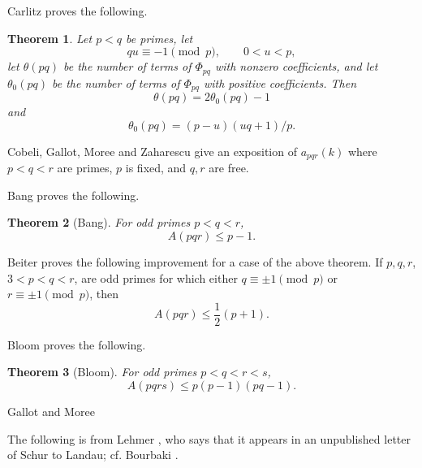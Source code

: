 \documentclass{amsart}
\newtheorem{theorem}{Theorem}
\theoremstyle{definition}
\begin{document}
Carlitz \cite{carlitz1966} proves the following.

\begin{theorem}
Let $p<q$ be primes,
let
\[
qu \equiv -1 \pmod{p},\qquad 0<u<p,
\]
let 
$\theta(pq)$ be the number of terms of $\Phi_{pq}$ with nonzero coefficients,
and
let $\theta_0(pq)$ be the number of terms of $\Phi_{pq}$ with positive coefficients.
Then
\[
\theta(pq) = 2\theta_0(pq)-1
\]
and
\[
\theta_0(pq) = (p-u)(uq+1)/p.
\]
\end{theorem}

Cobeli, Gallot, Moree and Zaharescu \cite{cobeli} give an exposition of $a_{pqr}(k)$ where $p<q<r$ are primes,
$p$ is fixed, and $q,r$ are free.






Bang \cite{bang} proves the following.

\begin{theorem}[Bang]
For odd primes $p<q<r$,
\[
A(pqr) \leq p-1.
\] 
\end{theorem}

Beiter \cite{beiter1968} proves the following improvement for a case of the above theorem.
If $p,q,r$, $3<p<q<r$, are odd primes for which
either $q \equiv \pm 1 \pmod{p}$ or $r \equiv \pm 1 \pmod{p}$, then
\[
A(pqr) \leq \frac{1}{2}(p+1).
\]



Bloom \cite{bloom} proves the following.

\begin{theorem}[Bloom]
For odd primes $p<q<r<s$,
\[
A(pqrs) \leq p(p-1)(pq-1).
\]
\end{theorem}

Gallot and Moree \cite{ternary}



The following is from Lehmer \cite{lehmer}, who says that it appears in an unpublished letter of Schur to Landau;
cf. Bourbaki \cite[V.~165, \S 11, Exercise 19]{bourbaki}.
\end{document}
